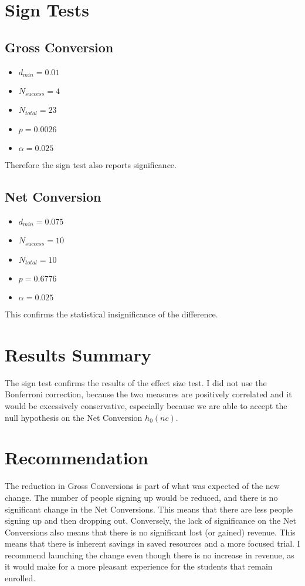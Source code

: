 \documentclass[12pt,a4paper]{article}
\begin{document}
\section{Sign Tests}
\subsection{Gross Conversion}
\begin{itemize}
\item $d_{min} = 0.01$
\item $N_{success} = 4$
\item $N_{total} = 23$
\item $p = 0.0026$
\item $\alpha = 0.025$
\end{itemize}

Therefore the sign test also reports significance.

\subsection{Net Conversion}
\begin{itemize}
\item $d_{min} = 0.075$
\item $N_{success} = 10$
\item $N_{total} = 10$
\item $p = 0.6776$
\item $\alpha = 0.025$
\end{itemize}

This confirms the statistical insignificance of the difference.

\section{Results Summary}
The sign test confirms the results of the effect size test. I did not use the
Bonferroni correction, because the two measures are positively correlated and it
would be excessively conservative, especially because we are able to accept the
null hypothesis on the Net Conversion $h_0(nc)$.

\section{Recommendation}
The reduction in Gross Conversions is part of what was expected of the new
change. The number of people signing up would be reduced, and there is no
significant change in the Net Conversions. This means that there are less people
signing up and then dropping out. Conversely, the lack of significance on the
Net Conversions also means that there is no significant lost (or gained)
revenue. This means that there is inherent savings in saved resources and a more
focused trial. I recommend launching the change even though there is no increase
in revenue, as it would make for a more pleasant experience for the students
that remain enrolled.
\end{document}
